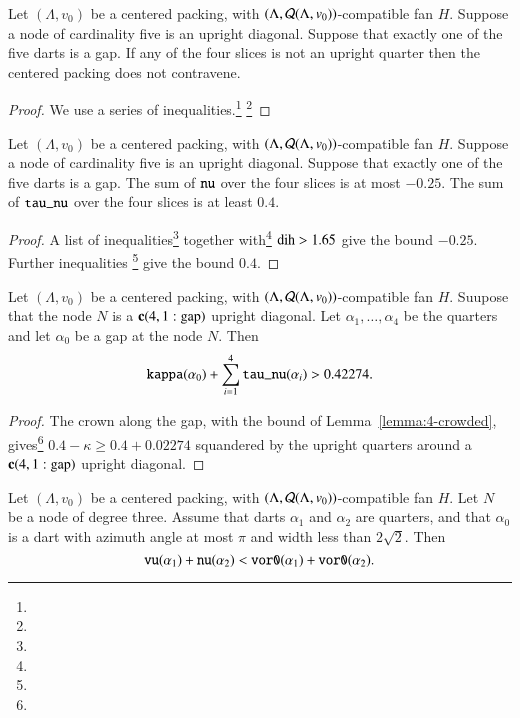 \begin{lemma}\label{lemma:4-crowdedq}
Let $(\Lambda,v_0)$ be a centered packing, 
with $(\Lambda,{\mathcal Q}(\Lambda,v_0))$-compatible fan $H$.
Suppose a node of cardinality five is an upright diagonal.
Suppose that exactly one of the five darts is a gap.
 If
any of the four slices is not an upright quarter then
the centered packing does not contravene.
\end{lemma}

\begin{proof}
We use a series of inequalities.\footnote{} %
\footnote{} %
\end{proof}

\begin{lemma}
\label{lemma:4-crowded}
Let $(\Lambda,v_0)$ be a centered packing, 
with $(\Lambda,{\mathcal Q}(\Lambda,v_0))$-compatible fan $H$.
Suppose a node of cardinality five is an upright diagonal.
Suppose that exactly one of the five darts is a gap.
The sum of ${\operatorname{{\texttt{nu}}}}$ over the four slices is at most
$-0.25$. The sum of ${\operatorname{{\texttt{tau\_nu}}}}$ over the
four slices is at least $0.4$.
\end{lemma}

\begin{proof}
A list of inequalities\footnote{} %
together with\footnote{} %
$\operatorname{dih}>1.65$ give the bound $-0.25$.
Further inequalities \footnote{} %
give the bound $0.4$.  
\end{proof}


\begin{lemma}  
Let $(\Lambda,v_0)$ be a centered packing, 
with $(\Lambda,{\mathcal Q}(\Lambda,v_0))$-compatible fan $H$.
Suupose that the node $N$ is a ${\operatorname{\bf c}}{(4,1:{\operatorname{gap}})}$ upright
diagonal.  Let $\alpha_1,\ldots,\alpha_4$ be the quarters
and let $\alpha_0$ be a gap at the node $N$.  Then
  $$
  {\operatorname{{\texttt{kappa}}}}(\alpha_0) + \sum_{i=1}^4 {\operatorname{{\texttt{tau\_nu}}}}(\alpha_i)
  > 0.42274.
  $$
\end{lemma}

\begin{proof}  The crown along the gap,
with the bound of Lemma~\ref{lemma:4-crowded}, 
gives\footnote{} %
    $0.4-\kappa \ge 0.4+0.02274$
squandered by the upright quarters around a ${\operatorname{\bf c}}{(4,1:{\operatorname{gap}})}$ upright
diagonal.
\end{proof}


\begin{lemma} \label{a:min0-vor} 
Let $(\Lambda,v_0)$ be a centered packing, 
with $(\Lambda,{\mathcal Q}(\Lambda,v_0))$-compatible fan $H$.
Let $N$ be a node of degree three.
Assume that darts $\alpha_1$ and $\alpha_2$ are quarters,
and that $\alpha_0$ is a dart with azimuth angle at most $\pi$ 
and width less than $2\sqrt2$.
Then $${\operatorname{{\texttt{vu}}}}(\alpha_1) + {\operatorname{{\texttt{nu}}}}(\alpha_2) <
     {\operatorname{{\texttt{vor0}}}}(\alpha_1) + {\operatorname{{\texttt{vor0}}}}(\alpha_2).$$
\end{lemma}

